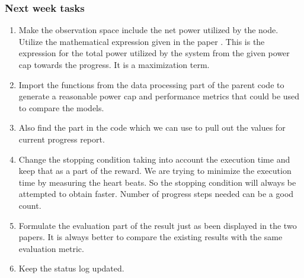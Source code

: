 \documentclass{article}
\begin{document}
\subsubsection{Next week tasks}
\begin{enumerate}
    \item Make the observation space include the net power utilized by the node. Utilize the mathematical expression given in the paper \cite{cerf2021sustaining}. This is the expression for the total power utilized by the system from the given power cap towards the progress. It is a maximization term.
    \item Import the functions from the data processing part of the parent code to generate a reasonable power cap and performance metrics that could be used to compare the models.
    \item Also find the part in the code which we can use to pull out the values for current progress report.
    \item Change the stopping condition taking into account the execution time and keep that as a part of the reward. We are trying to minimize the execution time by measuring the heart beats. So the stopping condition will always be attempted to obtain faster. Number of progress steps needed can be a good count.
    \item Formulate the evaluation part of the result just as been displayed in the two papers. It is always better to compare the existing results with the same evaluation metric.
    \item Keep the status log updated.
    
\end{enumerate}




\end{document}
